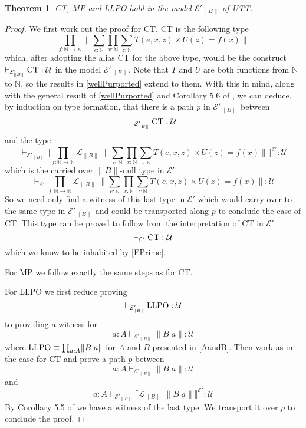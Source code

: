 \documentclass[12pt]{report}
\newtheorem{thm}{Theorem}[section]
\theoremstyle{definition}
\begin{document}
\begin{thm}
CT, MP and LLPO hold in the model $\mathcal{E}'_{\lVert B \rVert}$ of UTT.
\end{thm}
\begin{proof}
We first work out the proof for CT. 
CT is the following type
$$\prod_{f : \mathbb{N}\rightarrow \mathbb{N}} \Big\lVert \sum_{e : \mathbb{N}} \prod_{x : \mathbb{N}} \sum_{z : \mathbb{N}} T(e,x,z) \times U(z) = f(x) \Big\rVert$$
which, after adopting the alias CT for the above type, would be the construct $\vdash_{\mathcal{E}'_{\lVert B \rVert}} \textnormal{CT} : \mathcal{U}$ in the model $\mathcal{E}'_{\lVert B \rVert}$. 
Note that $T$ and $U$ are both functions from $\mathbb{N}$ to $\mathbb{N}$, so the results in \ref{wellPurported} extend to them. 
With this in mind, along with the general result of \ref{wellPurported} and Corollary 5.6 of \cite{1905.03014}, we can deduce, by induction on type formation, that there is a path $p$ in $\mathcal{E}'_{\lVert B \rVert}$ between 
$$\vdash_{\mathcal{E}'_{\lVert B \rVert}} \textnormal{CT} : \mathcal{U}$$ 
and the type 
$$\vdash_{\mathcal{E}'_{\lVert B \rVert}} \bigg\llbracket \prod_{f : \mathbb{N}\rightarrow \mathbb{N}} \mathcal{L}_{\lVert B \rVert}\;\Big\lVert \sum_{e : \mathbb{N}} \prod_{x : \mathbb{N}} \sum_{z : \mathbb{N}} T(e,x,z) \times U(z) = f(x) \Big\rVert \bigg\rrbracket^{\mathcal{E}'} : \mathcal{U}$$
which is the carried over $\lVert B \rVert$-null type in $\mathcal{E}'$
$$\vdash_{\mathcal{E}'} \prod_{f : \mathbb{N}\rightarrow \mathbb{N}} \mathcal{L}_{\lVert B \rVert}\;\Big\lVert \sum_{e : \mathbb{N}} \prod_{x : \mathbb{N}} \sum_{z : \mathbb{N}} T(e,x,z) \times U(z) = f(x) \Big\rVert : \mathcal{U}$$ 
So we need only find a witness of this last type in $\mathcal{E}'$ which would carry over to the same type in $\mathcal{E}'_{\lVert B \rVert}$ and could be transported along $p$ to conclude the case of CT. 
This type can be proved to follow from the interpretation of CT in $\mathcal{E}'$ 
$$\vdash_{\mathcal{E}'} \textnormal{CT} : \mathcal{U}$$
which we know to be inhabited by \ref{EPrime}. 

For MP we follow exactly the same steps as for CT. 

For LLPO we first reduce proving 
$$\vdash_{\mathcal{E}'_{\lVert B \rVert}} \textnormal{LLPO} : \mathcal{U}$$
to providing a witness for 
$$a : A \vdash_{\mathcal{E}'_{\lVert B \rVert}} \lVert B\;a\rVert : \mathcal{U}$$
where $\textnormal{LLPO} \equiv \prod_{a : A}\lVert B\;a \rVert$ for $A$ and $B$ presented in \ref{AandB}. 
Then work as in the case for CT and prove a path $p$ between
$$a : A \vdash_{\mathcal{E}'_{\lVert B \rVert}} \lVert B\;a\rVert : \mathcal{U}$$
and
$$a : A \vdash_{\mathcal{E}'_{\lVert B \rVert}} \big\llbracket \mathcal{L}_{\lVert B \rVert}\; \lVert B\;a\rVert \big\rrbracket^{\mathcal{E}'} : \mathcal{U}$$
By Corollary 5.5 of \cite{1905.03014} we have a witness of the last type. 
We transport it over $p$ to conclude the proof. 
\end{proof}
\end{document}
